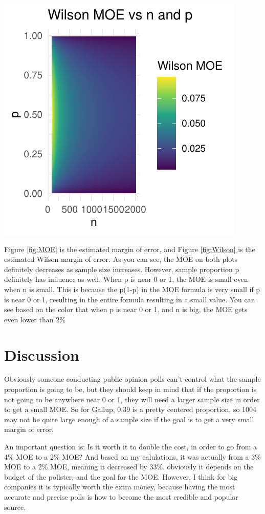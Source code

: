 \documentclass{article}\usepackage[]{graphicx}\usepackage[]{xcolor}
\newenvironment{Figure}
  {\par\medskip\noindent\minipage{\linewidth}}
  {\endminipage\par\medskip}
\begin{document}
\begin{multicols}{2}
\begin{Figure}
\includegraphics{Wilson.plot.pdf}
\label{fig:Wilson}
\end{Figure}
Figure \ref{fig:MOE} is the estimated margin of error, and Figure \ref{fig:Wilson} is the estimated Wilson margin of error. As you can see, the MOE on both plots definitely decreases as sample size increases. However, sample proportion p definitely has influence as well. When p is near 0 or 1, the MOE is small even when n is small. This is because the p(1-p) in the MOE formula is very small if p is near 0 or 1, resulting in the entire formula resulting in a small value. You can see based on the color that when p is near 0 or 1, and n is big, the MOE gets even lower than 2\%
\section{Discussion}
Obviously someone conducting public opinion polls can't control what the sample proportion is going to be, but they should keep in mind that if the proportion is not going to be anywhere near 0 or 1, they will need a larger sample size in order to get a small MOE. So for Gallup, 0.39 is a pretty centered proportion, so 1004 may not be quite large enough of a sample size if the goal is to get a very small margin of error.

An important question is: Is it worth it to double the cost, in order to go from a 4\% MOE to a 2\% MOE? And based on my calulations, it was actually from a 3\% MOE to a 2\% MOE, meaning it decreased by 33\%. obviously it depends on the budget of the pollster, and the goal for the MOE. However, I think for big companies it is typically worth the extra money, because having the most accurate and precise polls is how to become the most credible and popular source.

\vspace{2em}

\begin{tiny}

\end{tiny}
\end{multicols}
\end{document}
